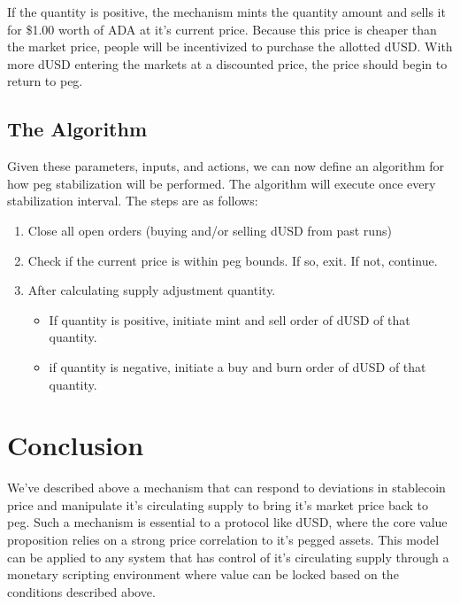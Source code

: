 \documentclass[12pt]{article}
\begin{document}
If the quantity is positive, the mechanism mints the quantity amount and sells it for \$1.00 worth of ADA at it's current price. Because this price is cheaper than the market price, people will be incentivized to purchase the allotted dUSD. With more dUSD entering the markets at a discounted price, the price should begin to return to peg.

\subsection{The Algorithm}

Given these parameters, inputs, and actions, we can now define an algorithm for how peg stabilization will be performed. The algorithm will execute once every stabilization interval. The steps are as follows:

\begin{enumerate}
    \item Close all open orders (buying and/or selling dUSD from past runs) 
    \item Check if the current price is within peg bounds. If so, exit. If not, continue.
    \item After calculating supply adjustment quantity.
        \begin{itemize}
            \item If quantity is positive, initiate mint and sell order of dUSD of that quantity.
            \item if quantity is negative, initiate a buy and burn order of dUSD of that quantity.
        \end{itemize}
\end{enumerate}


\section{Conclusion}

We've described above a mechanism that can respond to deviations in stablecoin price and manipulate it's circulating supply to bring it's market price back to peg. Such a mechanism is essential to a protocol like dUSD, where the core value proposition relies on a strong price correlation to it's pegged assets. This model can be applied to any system that has control of it's circulating supply through a monetary scripting environment where value can be locked based on the conditions described above.
\end{document}
